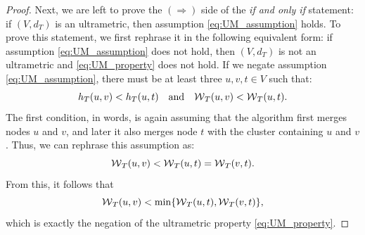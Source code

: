 \begin{proof}
Next, we are left to prove the $(\Rightarrow)$ side of the \emph{if and only if} statement: if $(V, d_{T})$ is an ultrametric, then assumption \ref{eq:UM_assumption} holds.
To prove this statement, we first rephrase it in the following equivalent form: if assumption \ref{eq:UM_assumption} does not hold, then $(V, d_{T})$ is not an ultrametric and \ref{eq:UM_property} does not hold. If we negate assumption \ref{eq:UM_assumption}, there must be at least three $u,v,t \in V$ such that: 
\begin{equation}
h_T(u, v) < h_T(u, t) \quad \text{and} \quad  \mathcal{W}{}_{T}(u,v) < \mathcal{W}{}_{T}(u,t).
\end{equation}
The first condition, in words, is again assuming that the algorithm first merges nodes $u$ and $v$, and later it also merges node $t$ with the cluster containing $u$ and $v$. Thus, we can rephrase this assumption as:
\begin{equation}
\mathcal{W}{}_{T}(u, v) < \mathcal{W}{}_{T}(u, t) = \mathcal{W}{}_{T}(v, t).
\end{equation}
From this, it follows that
\begin{equation}
\mathcal{W}{}_{T}(u, v) < \min \{\mathcal{W}{}_{T}(u, t), \mathcal{W}{}_{T}(v, t)\},
\end{equation}
which is exactly the negation of the ultrametric property \ref{eq:UM_property}.
\end{proof}

